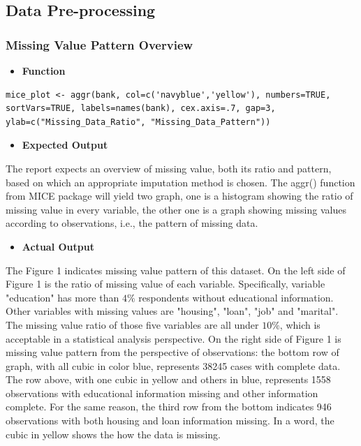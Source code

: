          \subsection{Data Pre-processing}    
         \subsubsection{Missing Value Pattern Overview}    
          \begin{itemize}
         	\item \textbf{Function}
         \end{itemize}
         \begin{lstlisting}
mice_plot <- aggr(bank, col=c('navyblue','yellow'), numbers=TRUE, sortVars=TRUE, labels=names(bank), cex.axis=.7, gap=3, ylab=c("Missing_Data_Ratio", "Missing_Data_Pattern"))
         \end{lstlisting}
         \begin{itemize}
         	\item \textbf{Expected Output}
         \end{itemize}
         The report expects an overview of missing value, both its ratio and pattern, based on which an appropriate imputation method is chosen. The aggr() function from MICE package will yield two graph, one is a histogram showing the ratio of missing value in every variable, the other one is a graph showing missing values according to observations, i.e., the pattern of missing data.\\
         \begin{itemize}
         	\item \textbf{Actual Output}
         \end{itemize}
      \noindent The Figure 1 indicates missing value pattern of this dataset. On the left side of Figure 1 is the ratio of missing value of each variable. Specifically, variable "education" has more than $4\%$ respondents without educational information. Other variables with missing values are "housing", "loan", "job" and "marital". The missing value ratio of those five variables are all under $10\%$, which is acceptable in a statistical analysis perspective. On the right side of Figure 1 is missing value pattern from the perspective of observations: the bottom row of graph, with all cubic in color blue, represents 38245 cases with complete data. The row above, with one cubic in yellow and others in blue, represents 1558 observations with educational information missing and other information complete. For the same reason, the third row from the bottom indicates 946 observations with both housing and loan information missing. In a word, the cubic in yellow shows the how the data is missing. \\
